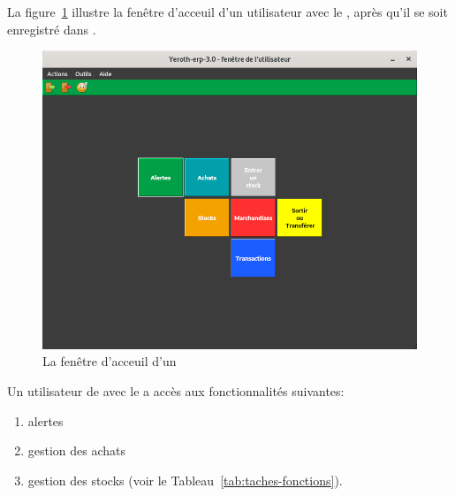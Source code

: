 \label{sec:utilisateurs-gestionairedestocks}

La figure~\ref{fig:yeren-fenetre-gestionairedestocks} illustre
la fen\^etre d'acceuil d'un utilisateur avec le \role \gestionairedestocks, 
apr\`es qu'il se soit enregistr\'e dans \yeren.\\

\begin{figure}[!htbp]
\centering
\includegraphics[scale=0.63]{images/yeren-fenetre-gestionairedestocks.png}
\caption{La fen\^etre d'acceuil d'un \gestionairedestocks}
\label{fig:yeren-fenetre-gestionairedestocks}
\end{figure}

Un utilisateur de \yeren avec le \role \gestionairedestocks a acc\`es
aux fonctionnalit\'es suivantes:
\begin{enumerate}[1)]
	\item alertes
	\item gestion des achats
	\item gestion des stocks (voir le Tableau~\ref{tab:taches-fonctions}).\\
\end{enumerate}
